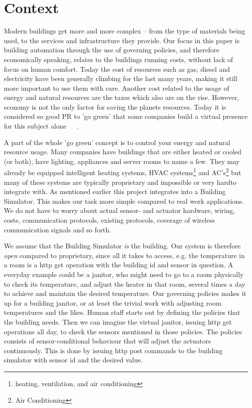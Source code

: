 \section{Context} \label{sec:context}
Modern buildings get more and more complex -- from the type of materials being used, to the services and infrastructure they provide. Our focus in this paper is building automation through the use of governing policies, and therefore economically speaking, relates to the buildings running costs, without lack of focus on human comfort. Today the cost of resources such as gas, diesel and electricity have been generally climbing for the last many years, making it still more important to use them with care. Another cost related to the usage of energy and natural resources are the taxes which also are on the rise. However, economy is not the only factor for saving the planets resources. Today it is considered so good PR to 'go green' that some companies build a virtual presence for this subject alone~\cite{green-google}~\cite{green-facebook}~\cite{green-microsoft}.

A part of the whole 'go green' concept is to control your energy and natural resource usage. Many companies have buildings that are either heated or cooled (or both), have lighting, appliances and server rooms to name a few. They may already be equipped intelligent heating systems, HVAC systems\footnote{heating, ventilation, and air conditioning} and AC's\footnote{Air Conditioning} but many of these systems are typically proprietary and impossible \textemdash or very hard\textemdash to integrate with. As mentioned earlier this project integrates into a Building Simulator. This makes our task more simple compared to real work applications. We do not have to worry about actual sensor- and actuator hardware, wiring, costs, communication protocols, existing protocols, coverage of wireless communication signals and so forth.

We assume that the Building Simulator \textit{is} the building. Our system is therefore \textit{open} compared to proprietary, since all it takes to access, e.g. the temperature in a room is a http get operation with the building id and sensor in question. A everyday example could be a janitor, who might need to go to a room physically to check its temperature, and adjust the heater in that room, several times a day to achieve and maintain the desired temperature. Our governing policies makes it up for a building janitor, or at least the trivial work with adjusting room temperatures and the likes. Human staff starts out by defining the policies that the building needs. Then we can imagine the virtual janitor, issuing http get operations all day, to check the sensors mentioned in those policies. The policies consists of sensor-conditional behaviour that will adjust the actuators continuously. This is done by issuing http post commands to the building simulator with sensor id and the desired value.

